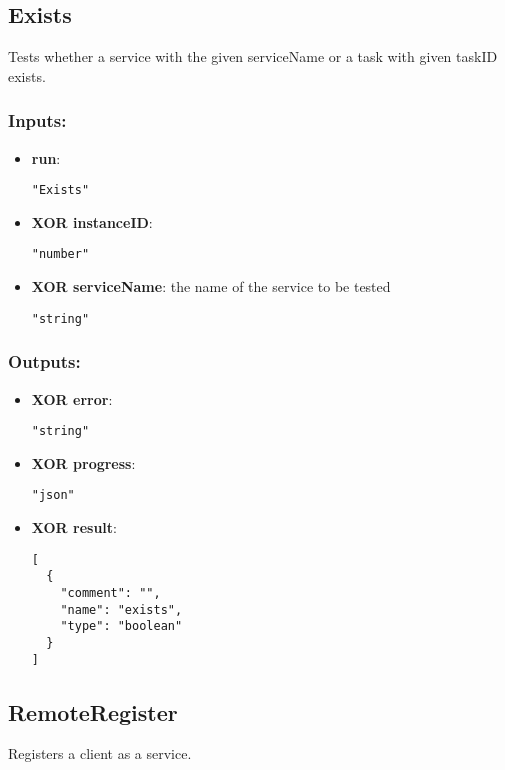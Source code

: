 \subsection{Exists}
Tests whether a service with the given serviceName or a task with given taskID exists.
\subsubsection*{Inputs:}
\begin{itemize}
    \item \textbf{run}: 
\begin{lstlisting}
"Exists"
\end{lstlisting}
    \item \textbf{XOR instanceID}: 
\begin{lstlisting}
"number"
\end{lstlisting}
    \item \textbf{XOR serviceName}: the name of the service to be tested
\begin{lstlisting}
"string"
\end{lstlisting}
  \end{itemize}

\subsubsection*{Outputs:}
\begin{itemize}
    \item \textbf{XOR error}: 
\begin{lstlisting}
"string"
\end{lstlisting}
    \item \textbf{XOR progress}: 
\begin{lstlisting}
"json"
\end{lstlisting}
    \item \textbf{XOR result}: 
\begin{lstlisting}
[
  {
    "comment": "", 
    "name": "exists", 
    "type": "boolean"
  }
]
\end{lstlisting}
  \end{itemize}

\subsection{RemoteRegister}
Registers a client as a service.
